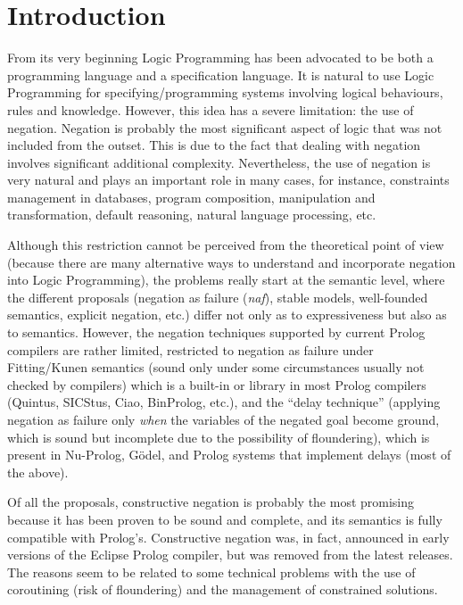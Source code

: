 \documentclass{llncs}
\newcommand{\naf}{{\em naf}}\newcommand{\viejo}[1]{}
\begin{document}

\section{Introduction}
\label{introduction}
From its very beginning Logic Programming has been advocated to be
both a programming language and a specification language. It is
natural to use Logic Programming for specifying/programming systems
involving logical behaviours, rules and knowledge. However, this idea
has a severe limitation: the use of negation. Negation is probably the
most significant aspect of logic that was not included from the
outset. This is due to the fact that dealing with negation involves
significant additional complexity. Nevertheless, the use of negation
is very natural and plays an important role in many cases, for
instance, constraints management in databases, program composition,
manipulation and transformation, default reasoning, natural language
processing, etc.

Although this restriction cannot be perceived from the theoretical point of
view (because there are many alternative ways to understand and
incorporate negation into Logic Programming), the problems really start
at the semantic level, where the different proposals (negation as
failure (\naf), stable models, well-founded semantics, explicit
negation, etc.)  differ not only as to expressiveness but also as to
semantics.  However, the negation techniques supported by current
Prolog compilers are rather limited, restricted to negation as failure
under Fitting/Kunen semantics \cite{Kunen} (sound only under some
circumstances usually not checked by compilers) which is a built-in or
library in most Prolog compilers (Quintus, SICStus, Ciao, BinProlog,
etc.), and the ``delay technique'' (applying negation as failure only
\emph{when} the variables of the negated goal become ground, which is
sound but incomplete due to the possibility of floundering), which is
present in Nu-Prolog, G\"odel, and Prolog systems that implement
delays (most of the above).

Of all the proposals, constructive negation \cite{Chan1,Chan2} is
probably the most promising because it has been proven to be sound and
complete, and its semantics is fully compatible with
Prolog's. Constructive negation was, in fact, announced in early
versions of the Eclipse Prolog compiler, but was removed from the
latest releases.  The reasons seem to be related to some technical
problems with the use of coroutining (risk of floundering) and the
management of constrained solutions.
\end{document}

